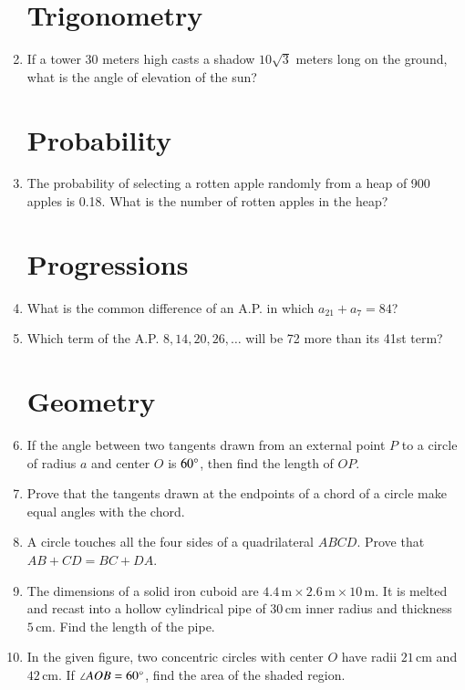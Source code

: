 \documentclass[12pt, letterpaper]{article}
\begin{document}
\begin{enumerate}
    \section*{Trigonometry}
    \item If a tower $30$ meters high casts a shadow $10\sqrt{3}$ meters long on the ground, what is the angle of elevation of the sun?

    \section*{Probability}
    \item The probability of selecting a rotten apple randomly from a heap of 900 apples is 0.18. What is the number of rotten apples in the heap?

    \section*{Progressions}
    \item What is the common difference of an A.P. in which $a_{21} + a_{7} = 84$?
    \item Which term of the A.P. $8, 14, 20, 26, \ldots$ will be 72 more than its 41st term?

    \section*{Geometry}
    \item If the angle between two tangents drawn from an external point $P$ to a circle of radius $a$ and center $O$ is $60\degree$, then find the length of $OP$.
    \item Prove that the tangents drawn at the endpoints of a chord of a circle make equal angles with the chord.
    \item A circle touches all the four sides of a quadrilateral $ABCD$. Prove that $AB + CD = BC + DA$.
    \item The dimensions of a solid iron cuboid are $4.4\,\text{m} \times 2.6\,\text{m} \times 10\,\text{m}$. It is melted and recast into a hollow cylindrical pipe of $30\,\text{cm}$ inner radius and thickness $5\,\text{cm}$. Find the length of the pipe.
    \item In the given figure, two concentric circles with center $O$ have radii $21\,\text{cm}$ and $42\,\text{cm}$. If $\angle AOB = 60\degree$, find the area of the shaded region.


\end{enumerate}
\end{document}
